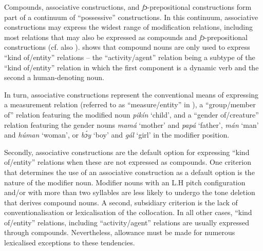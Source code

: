 \begin{table}
\caption{Tendencies of nominal compounding}
\label{tab:key:4.5}
\end{table}
Compounds, associative constructions, and \textit{fɔ}{}-prepositional constructions form part of a continuum of “possessive” constructions. In this continuum, associative constructions may express the widest range of modification relations, including most relations that may also be expressed as compounds and \textit{fɔ}{}-prepositional constructions (cf. also ).  shows that compound nouns are only used to express “kind of/entity” relations – the “activity/agent” relation being a subtype of the “kind of/entity” relation in which the first component is a dynamic verb and the second a human-denoting noun.


In turn, associative constructions represent the conventional means of expressing a measurement relation (referred to as “measure\slash entity” in ), a “group\slash member of” relation featuring the modified noun \textit{pikín} ‘child’, and a “gender of\slash creature” relation featuring the gender nouns \textit{mamá} ‘mother’ and \textit{papá} ‘father’, \textit{mán} ‘man’ and \textit{húman} ‘woman’, or \textit{bɔ́y} ‘boy’ and \textit{gál} ‘girl’ in the modifier position. 



Secondly, associative constructions are the default option for expressing “kind of\slash entity” relations when these are not expressed as compounds. One criterion that determines the use of an associative construction as a default option is the nature of the modifier noun. Modifier nouns with an L.H pitch configuration and/or with more than two syllables are less likely to undergo the tone deletion that derives compound nouns. A second, subsidiary criterion is the lack of conventionalisation or lexicalisation of the collocation. In all other cases, “kind of\slash entity” relations, including “activity\slash agent” relations are usually expressed through compounds. Nevertheless, allowance must be made for numerous lexicalised exceptions to these tendencies.



